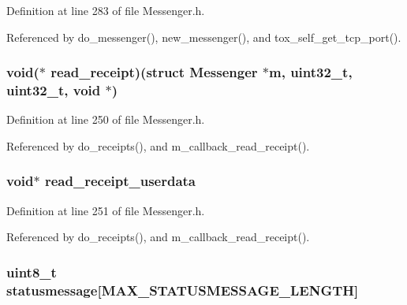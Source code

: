 Definition at line 283 of file Messenger.\+h.



Referenced by do\+\_\+messenger(), new\+\_\+messenger(), and tox\+\_\+self\+\_\+get\+\_\+tcp\+\_\+port().

\hypertarget{struct_messenger_aa90ada8f04c210bdf2a6da03422ef96b}{
\subsubsection[{read\+\_\+receipt}]{\setlength{\rightskip}{0pt plus 5cm}void($\ast$ read\+\_\+receipt)(struct {\bf Messenger} $\ast${\bf m}, uint32\+\_\+t, uint32\+\_\+t, void $\ast$)}}\label{struct_messenger_aa90ada8f04c210bdf2a6da03422ef96b}


Definition at line 250 of file Messenger.\+h.



Referenced by do\+\_\+receipts(), and m\+\_\+callback\+\_\+read\+\_\+receipt().

\hypertarget{struct_messenger_a82edcd1ba67ee440c38eb01b3003b900}{
\subsubsection[{read\+\_\+receipt\+\_\+userdata}]{\setlength{\rightskip}{0pt plus 5cm}void$\ast$ read\+\_\+receipt\+\_\+userdata}}\label{struct_messenger_a82edcd1ba67ee440c38eb01b3003b900}


Definition at line 251 of file Messenger.\+h.



Referenced by do\+\_\+receipts(), and m\+\_\+callback\+\_\+read\+\_\+receipt().

\hypertarget{struct_messenger_a8f12612ac1191135a1a5b1cbcbc82852}{
\subsubsection[{statusmessage}]{\setlength{\rightskip}{0pt plus 5cm}uint8\+\_\+t statusmessage\mbox{[}{\bf M\+A\+X\+\_\+\+S\+T\+A\+T\+U\+S\+M\+E\+S\+S\+A\+G\+E\+\_\+\+L\+E\+N\+G\+T\+H}\mbox{]}}}\label{struct_messenger_a8f12612ac1191135a1a5b1cbcbc82852}



